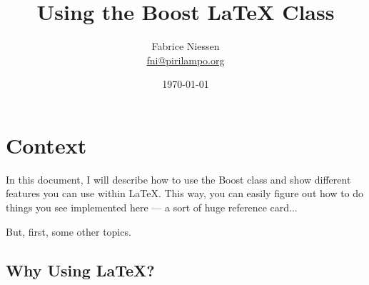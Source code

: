 \documentclass{boostreport}
\title{Using the Boost \LaTeX{} Class}
\author{Fabrice Niessen \\ \href{mailto:fni@pirilampo.org}{fni@pirilampo.org}}
\date{\today}
\begin{document}

\maketitle[caption=Internal documentation]

\newpage


\tableofcontents



\newpage


\section{Context}
\label{sec:context}

In this document, I will describe how to use the Boost class and show
different features you can use within \LaTeX{}. This way, you can easily
figure out how to do things you see implemented here --- a sort of huge
reference card...

But, first, some other topics.

\subsection*{Why Using \LaTeX{}?}
\label{sec:why-choosing-latex}
\end{document}
